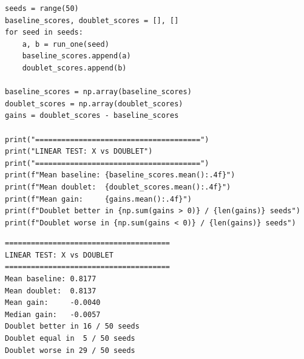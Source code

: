 \documentclass[11pt,a4paper]{report}
\begin{document}
\begin{lstlisting}[caption=SBOHN Experiment 3: linear test]
seeds = range(50)
baseline_scores, doublet_scores = [], []
for seed in seeds:
    a, b = run_one(seed)
    baseline_scores.append(a)
    doublet_scores.append(b)

baseline_scores = np.array(baseline_scores)
doublet_scores = np.array(doublet_scores)
gains = doublet_scores - baseline_scores

print("======================================")
print("LINEAR TEST: X vs DOUBLET")
print("======================================")
print(f"Mean baseline: {baseline_scores.mean():.4f}")
print(f"Mean doublet:  {doublet_scores.mean():.4f}")
print(f"Mean gain:     {gains.mean():.4f}")
print(f"Doublet better in {np.sum(gains > 0)} / {len(gains)} seeds")
print(f"Doublet worse in {np.sum(gains < 0)} / {len(gains)} seeds")
\end{lstlisting}

\label{app:ch3-lst6}
\begin{lstlisting}[style=textstyle, caption=Result of SBOHN-3 experiment]
======================================
LINEAR TEST: X vs DOUBLET
======================================
Mean baseline: 0.8177
Mean doublet:  0.8137
Mean gain:     -0.0040
Median gain:   -0.0057
Doublet better in 16 / 50 seeds
Doublet equal in  5 / 50 seeds
Doublet worse in 29 / 50 seeds
\end{lstlisting}
\end{document}
